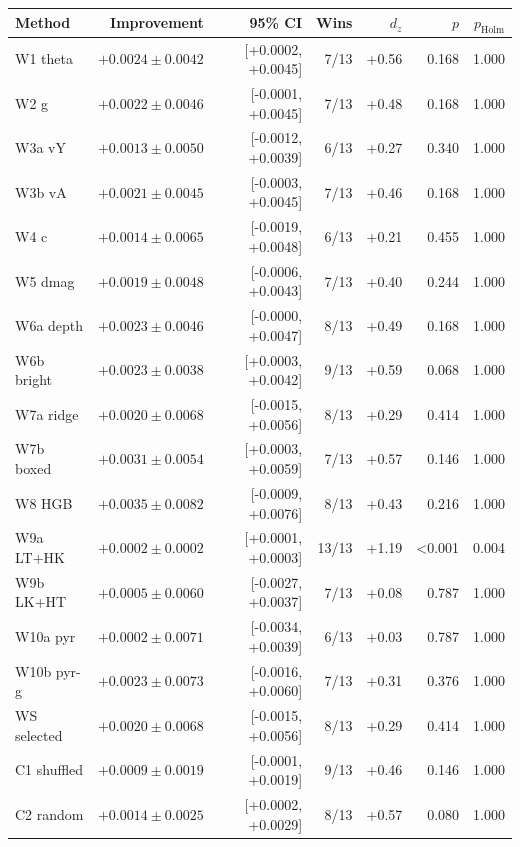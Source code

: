 \begin{tabular}{lrrrrrr}
\toprule
Method & Improvement & 95\% CI & Wins & $d_z$ & $p$ & $p_{\mathrm{Holm}}$ \\
\midrule
W1 theta & $+0.0024 \pm 0.0042$ & [+0.0002, +0.0045] & 7/13 & +0.56 & 0.168 & 1.000 \\
W2 g & $+0.0022 \pm 0.0046$ & [-0.0001, +0.0045] & 7/13 & +0.48 & 0.168 & 1.000 \\
W3a vY & $+0.0013 \pm 0.0050$ & [-0.0012, +0.0039] & 6/13 & +0.27 & 0.340 & 1.000 \\
W3b vA & $+0.0021 \pm 0.0045$ & [-0.0003, +0.0045] & 7/13 & +0.46 & 0.168 & 1.000 \\
W4 c & $+0.0014 \pm 0.0065$ & [-0.0019, +0.0048] & 6/13 & +0.21 & 0.455 & 1.000 \\
W5 dmag & $+0.0019 \pm 0.0048$ & [-0.0006, +0.0043] & 7/13 & +0.40 & 0.244 & 1.000 \\
W6a depth & $+0.0023 \pm 0.0046$ & [-0.0000, +0.0047] & 8/13 & +0.49 & 0.168 & 1.000 \\
W6b bright & $+0.0023 \pm 0.0038$ & [+0.0003, +0.0042] & 9/13 & +0.59 & 0.068 & 1.000 \\
W7a ridge & $+0.0020 \pm 0.0068$ & [-0.0015, +0.0056] & 8/13 & +0.29 & 0.414 & 1.000 \\
W7b boxed & $+0.0031 \pm 0.0054$ & [+0.0003, +0.0059] & 7/13 & +0.57 & 0.146 & 1.000 \\
W8 HGB & $+0.0035 \pm 0.0082$ & [-0.0009, +0.0076] & 8/13 & +0.43 & 0.216 & 1.000 \\
W9a LT+HK & $+0.0002 \pm 0.0002$ & [+0.0001, +0.0003] & 13/13 & +1.19 & <0.001 & 0.004 \\
W9b LK+HT & $+0.0005 \pm 0.0060$ & [-0.0027, +0.0037] & 7/13 & +0.08 & 0.787 & 1.000 \\
W10a pyr & $+0.0002 \pm 0.0071$ & [-0.0034, +0.0039] & 6/13 & +0.03 & 0.787 & 1.000 \\
W10b pyr-g & $+0.0023 \pm 0.0073$ & [-0.0016, +0.0060] & 7/13 & +0.31 & 0.376 & 1.000 \\
WS selected & $+0.0020 \pm 0.0068$ & [-0.0015, +0.0056] & 8/13 & +0.29 & 0.414 & 1.000 \\
C1 shuffled & $+0.0009 \pm 0.0019$ & [-0.0001, +0.0019] & 9/13 & +0.46 & 0.146 & 1.000 \\
C2 random & $+0.0014 \pm 0.0025$ & [+0.0002, +0.0029] & 8/13 & +0.57 & 0.080 & 1.000 \\
\bottomrule
\end{tabular}
